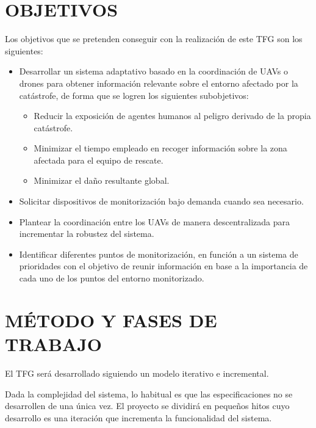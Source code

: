 \documentclass{pre-tfg}
\begin{document}
\section{OBJETIVOS}

Los objetivos que se pretenden conseguir con la realización de este TFG son los siguientes:

\begin{itemize}

\item Desarrollar un sistema adaptativo basado en la coordinación de UAVs o drones para obtener información relevante sobre el entorno afectado por la catástrofe, de forma que se logren los siguientes subobjetivos:

\begin{itemize}
\item Reducir la exposición de agentes humanos al peligro derivado de la propia catástrofe.
\item Minimizar el tiempo empleado en recoger información sobre la zona afectada para el equipo de rescate.
\item Minimizar el daño resultante global.

\end{itemize}

\item Solicitar dispositivos de monitorización bajo demanda cuando sea necesario.

\item Plantear la coordinación entre los UAVs de manera descentralizada para incrementar la robustez del sistema.

\item Identificar diferentes puntos de monitorización, en función a un sistema de prioridades con el objetivo de reunir información en base a la importancia de cada uno de los puntos del entorno monitorizado.

\end {itemize}

\section{MÉTODO Y FASES DE TRABAJO}

El TFG será desarrollado siguiendo un modelo iterativo e incremental.

Dada la complejidad del sistema, lo habitual es que las especificaciones no se desarrollen de una única vez. El proyecto se dividirá en pequeños hitos cuyo desarrollo es una iteración que incrementa la funcionalidad del sistema.
\end{document}
